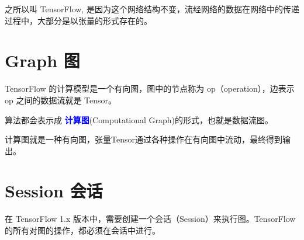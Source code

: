 之所以叫 TensorFlow, 是因为这个网络结构不变，流经网络的数据在网络中的传递过程中，大部分是以张量的形式存在的。

\section{Graph 图}
TensorFlow 的计算模型是一个有向图，图中的节点称为 op（operation），边表示 op 之间的数据流就是 Tensor。

算法都会表示成 \textcolor{blue}{\textbf{计算图}}(Computational Graph)的形式，也就是数据流图。

计算图就是一种有向图，张量Tensor通过各种操作在有向图中流动，最终得到输出。

\section{Session 会话}
在 TensorFlow 1.x 版本中，需要创建一个会话（Session）来执行图。TensorFlow的所有对图的操作，都必须在会话中进行。




